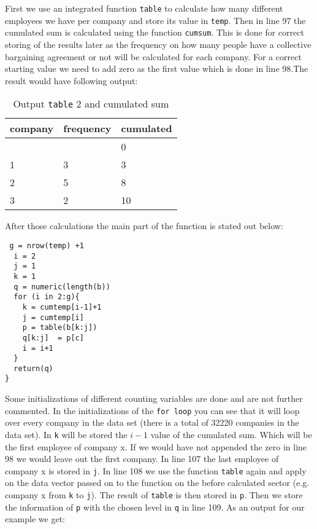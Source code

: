 First we use an integrated function \texttt{table} to calculate how many different employees we have per company and store its value in \texttt{temp}. Then in line 97 the cumulated sum is calculated using the function \texttt{cumsum}. This is done for correct storing of the results later as the frequency on how many people have a collective bargaining agreement or not will be calculated for each company. For a correct starting value we need to add zero as the first value which is done in line 98.The result would have following output:
\newline
\begin{table}[h!]
\centering
\caption{Output \texttt{table} 2 and cumulated sum}
\label{my-label}
\begin{tabular}{|l|l|l|}
\hline
company & frequency & cumulated \\ \hline
        &           & 0         \\ \hline
1       & 3         & 3         \\ \hline
2       & 5         & 8         \\ \hline
3       & 2         & 10        \\ \hline
\end{tabular}
\end{table}
\newline
After those calculations the main part of the function is stated out below:
\lstset{firstnumber = 100}
\begin{lstlisting}
 g = nrow(temp) +1
  i = 2                                   
  j = 1
  k = 1
  q = numeric(length(b))
  for (i in 2:g){
    k = cumtemp[i-1]+1                    
    j = cumtemp[i]                         
    p = table(b[k:j])                     
    q[k:j]  = p[c]                   
    i = i+1
  }
  return(q)
}   
\end{lstlisting}
Some initializations of different counting variables are done and are not further commented. In the initializations of the \texttt{for loop} you can see that it will loop over every company in the data set (there is a total of 32220 companies in the data set). In \texttt{k} will be stored the $i-1$ value of the cumulated sum. Which will be the first employee of company x. If we would have not appended the zero in line 98 we would leave out the first company. In line 107 the last employee of company x is stored in \texttt{j}. In line 108 we use the function \texttt{table} again and apply on the data vector passed on to the function on the before calculated sector (e.g. company x from \texttt{k} to \texttt{j}). The result of \texttt{table} is then stored in \texttt{p}. Then we store the information of \texttt{p} with the chosen level in \texttt{q} in line 109. As an output for our example we get:
